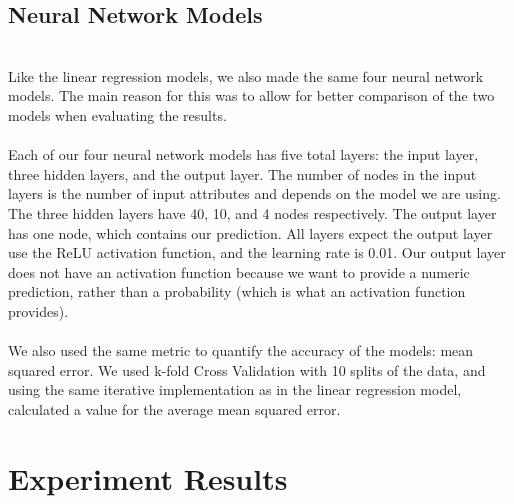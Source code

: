\documentclass[letterpaper, 11 pt, conference]{article}
\begin{document}
\subsection{Neural Network Models}
\\Like the linear regression models, we also made the same four neural network models. The main reason for this was to allow for better comparison of the two models when evaluating the results. 
\\
\\ Each of our four neural network models has five total layers: the input layer, three hidden layers, and the output layer. The number of nodes in the input layers is the number of input attributes and depends on the model we are using. The three hidden layers have 40, 10, and 4 nodes respectively. The output layer has one node, which contains our prediction. All layers expect the output layer use the ReLU activation function, and the learning rate is 0.01. Our output layer does not have an activation function because we want to provide a numeric prediction, rather than a probability (which is what an activation function provides).
\\
\\We also used the same metric to quantify the accuracy of the models: mean squared error. We used k-fold Cross Validation with 10 splits of the data, and using the same iterative implementation as in the linear regression model, calculated a value for the average mean squared error.

\section{Experiment Results}
\end{document}
